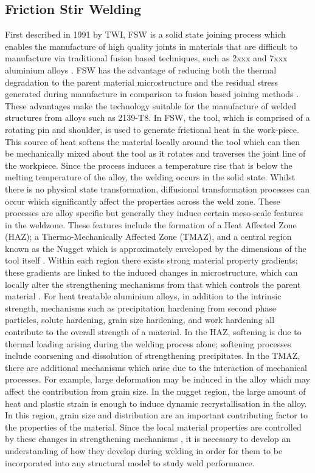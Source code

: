 \subsection{Friction Stir Welding}
\label{IntroFSW}
First described in 1991 by TWI, FSW is a solid state joining process which enables the manufacture of high quality joints in materials that are difficult to manufacture via traditional fusion based techniques, such as 2xxx and 7xxx aluminium alloys \cite{Karlsson2000,Peel2003}.  FSW has the advantage of reducing both the thermal degradation to the parent material microstructure and the residual stress generated during manufacture in comparison to fusion based joining methods \cite{Mishra2005}. These advantages make the technology suitable for the manufacture of welded structures from alloys such as 2139-T8. 
In FSW, the tool, which is comprised of a rotating pin and shoulder, is used to generate frictional heat in the work-piece. This source of heat softens the material locally around the tool which can then be mechanically mixed about the tool as it rotates and traverses the joint line of the workpiece. Since the process induces a temperature rise that is below the melting temperature of the alloy, the welding occurs in the solid state. 
Whilst there is no physical state transformation, diffusional transformation processes can occur which significantly affect the properties across the weld zone. These processes are alloy specific but generally they induce certain meso-scale features in the weldzone. These features include the formation of a Heat Affected Zone (HAZ); a Thermo-Mechanically Affected Zone (TMAZ), and a central region known as the Nugget which is approximately enveloped by the dimensions of the tool itself \cite{Mishra2005}. Within each region there exists strong material property gradients; these gradients are linked to the induced changes in microstructure, which can locally alter the strengthening mechanisms from that which controls the parent material \cite{Su2003,Mahoney1998}. 
For heat treatable aluminium alloys, in addition to the intrinsic strength, mechanisms such as precipitation hardening from second phase particles, solute hardening, grain size hardening, and work hardening all contribute to the overall strength of a material. In the HAZ, softening is due to thermal loading arising during the welding process alone; softening processes include coarsening and dissolution of strengthening precipitates. In the TMAZ, there are additional mechanisms which arise due to the interaction of mechanical processes. For example, large deformation may be induced in the alloy which may affect the contribution from grain size. In the nugget region, the large amount of heat and plastic strain is enough to induce dynamic recrystallisation in the alloy. In this region, grain size and distribution are an important contributing factor to the properties of the material. Since the local material properties are controlled by these changes in strengthening mechanisms \cite{Karlsson2000}, it is necessary to develop an understanding of how they develop during welding in order for them to be incorporated into any structural model to study weld performance.

